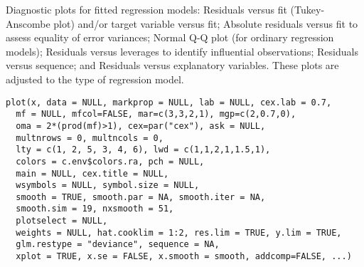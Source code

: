 \documentclass{article}
\begin{document}
\begin{Description}\relax
Diagnostic plots for fitted regression models:
Residuals versus fit (Tukey-Anscombe plot) and/or target variable
versus fit;
Absolute residuals versus fit to assess equality of error variances;
Normal Q-Q plot (for ordinary regression models);
Residuals versus leverages to identify influential observations;
Residuals versus sequence;
and Residuals versus explanatory variables.
These plots are adjusted to the type of regression model.
\end{Description}
\begin{Usage}
\begin{verbatim}
plot(x, data = NULL, markprop = NULL, lab = NULL, cex.lab = 0.7,
  mf = NULL, mfcol=FALSE, mar=c(3,3,2,1), mgp=c(2,0.7,0),
  oma = 2*(prod(mf)>1), cex=par("cex"), ask = NULL, 
  multnrows = 0, multncols = 0,
  lty = c(1, 2, 5, 3, 4, 6), lwd = c(1,1,2,1,1.5,1),
  colors = c.env$colors.ra, pch = NULL,
  main = NULL, cex.title = NULL,
  wsymbols = NULL, symbol.size = NULL,
  smooth = TRUE, smooth.par = NA, smooth.iter = NA, 
  smooth.sim = 19, nxsmooth = 51,
  plotselect = NULL, 
  weights = NULL, hat.cooklim = 1:2, res.lim = TRUE, y.lim = TRUE,
  glm.restype = "deviance", sequence = NA,
  xplot = TRUE, x.se = FALSE, x.smooth = smooth, addcomp=FALSE, ...)
\end{verbatim}
\end{Usage}
\end{document}
